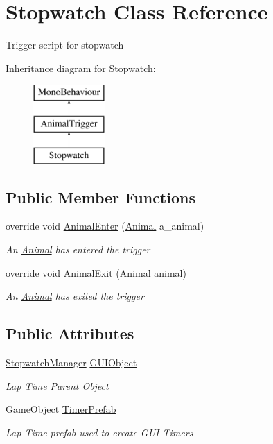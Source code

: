 \hypertarget{class_stopwatch}{}\section{Stopwatch Class Reference}
\label{class_stopwatch}


Trigger script for stopwatch  


Inheritance diagram for Stopwatch\+:\begin{figure}[H]
\begin{center}
\leavevmode
\includegraphics[height=3.000000cm]{class_stopwatch}
\end{center}
\end{figure}
\subsection*{Public Member Functions}
\begin{DoxyCompactItemize}
\item 
override void \mbox{\hyperlink{class_stopwatch_abd930ea70de15bd24e05f63ba89a640e}{Animal\+Enter}} (\mbox{\hyperlink{class_animal}{Animal}} a\+\_\+animal)
\begin{DoxyCompactList}\small\item\em An \mbox{\hyperlink{class_animal}{Animal}} has entered the trigger \end{DoxyCompactList}\item 
override void \mbox{\hyperlink{class_stopwatch_ad71c492f52e3396c648501c315bae5e5}{Animal\+Exit}} (\mbox{\hyperlink{class_animal}{Animal}} animal)
\begin{DoxyCompactList}\small\item\em An \mbox{\hyperlink{class_animal}{Animal}} has exited the trigger \end{DoxyCompactList}\end{DoxyCompactItemize}
\subsection*{Public Attributes}
\begin{DoxyCompactItemize}
\item 
\mbox{\hyperlink{class_stopwatch_manager}{Stopwatch\+Manager}} \mbox{\hyperlink{class_stopwatch_a5150a5983a590f49e150e9aa1198b581}{G\+U\+I\+Object}}
\begin{DoxyCompactList}\small\item\em Lap Time Parent Object \end{DoxyCompactList}\item 
Game\+Object \mbox{\hyperlink{class_stopwatch_a2b171fcfbbe6042c381eea3f0697d831}{Timer\+Prefab}}
\begin{DoxyCompactList}\small\item\em Lap Time prefab used to create G\+UI Timers \end{DoxyCompactList}\end{DoxyCompactItemize}
